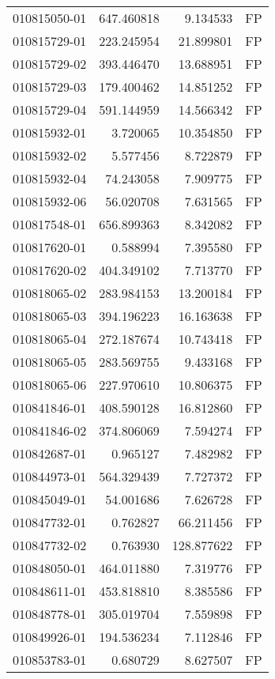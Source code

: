 \begin{tabular}{lrrl}
010815050-01 &  647.460818 &     9.134533 &   FP \\
010815729-01 &  223.245954 &    21.899801 &   FP \\
010815729-02 &  393.446470 &    13.688951 &   FP \\
010815729-03 &  179.400462 &    14.851252 &   FP \\
010815729-04 &  591.144959 &    14.566342 &   FP \\
010815932-01 &    3.720065 &    10.354850 &   FP \\
010815932-02 &    5.577456 &     8.722879 &   FP \\
010815932-04 &   74.243058 &     7.909775 &   FP \\
010815932-06 &   56.020708 &     7.631565 &   FP \\
010817548-01 &  656.899363 &     8.342082 &   FP \\
010817620-01 &    0.588994 &     7.395580 &   FP \\
010817620-02 &  404.349102 &     7.713770 &   FP \\
010818065-02 &  283.984153 &    13.200184 &   FP \\
010818065-03 &  394.196223 &    16.163638 &   FP \\
010818065-04 &  272.187674 &    10.743418 &   FP \\
010818065-05 &  283.569755 &     9.433168 &   FP \\
010818065-06 &  227.970610 &    10.806375 &   FP \\
010841846-01 &  408.590128 &    16.812860 &   FP \\
010841846-02 &  374.806069 &     7.594274 &   FP \\
010842687-01 &    0.965127 &     7.482982 &   FP \\
010844973-01 &  564.329439 &     7.727372 &   FP \\
010845049-01 &   54.001686 &     7.626728 &   FP \\
010847732-01 &    0.762827 &    66.211456 &   FP \\
010847732-02 &    0.763930 &   128.877622 &   FP \\
010848050-01 &  464.011880 &     7.319776 &   FP \\
010848611-01 &  453.818810 &     8.385586 &   FP \\
010848778-01 &  305.019704 &     7.559898 &   FP \\
010849926-01 &  194.536234 &     7.112846 &   FP \\
010853783-01 &    0.680729 &     8.627507 &   FP \\

\end{tabular}

